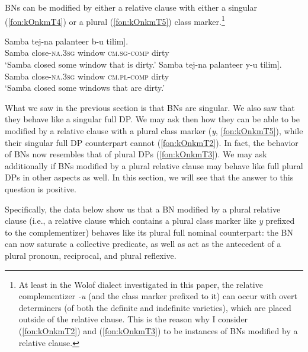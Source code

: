\documentclass[output=paper]{langscibook}
\begin{document}
\noindent   BNs can be modified by either a relative clause with either a singular (\ref{fon:kOnkmT4}) or a plural (\ref{fon:kOnkmT5}) class marker.\footnote{At least in the Wolof dialect investigated in this paper, the relative complementizer \textit{-u} (and the class marker prefixed to it) can occur with overt determiners (of both the definite and indefinite varieties), which are placed outside of the relative clause. This is the reason why I consider (\ref{fon:kOnkmT2}) and (\ref{fon:kOnkmT3}) to be instances of BNs modified by a relative clause.}
	
	
		\ea
				\ea \gll	Samba tej-na {palanteer} \minsp{[} b-u tilim].\\
					Samba close-\textsc{na.3sg} window {} \textsc{cm.sg-comp} dirty\\
					\glt    `Samba closed some window that is dirty.'\label{fon:kOnkmT4}
				\ex \gll	Samba tej-na {palanteer} \minsp{[} y-u tilim].\\
					Samba close-\textsc{na.3sg} window {} \textsc{cm.pl-comp} dirty\\
					\glt    `Samba closed some windows that are dirty.'\label{fon:kOnkmT5}
        		\z
	    \z

	
\noindent What we saw in the previous section is that BNs are singular. We also saw that they behave like a singular full DP. We may ask then how they can be able to be modified by a relative clause with a plural class marker (\textit{y}, \ref{fon:kOnkmT5}), while their singular full DP counterpart cannot (\ref{fon:kOnkmT2}). In fact, the behavior of BNs now resembles that of plural DPs (\ref{fon:kOnkmT3}). We may ask additionally if BNs modified by a plural relative clause may behave like full plural DPs in other aspects as well. In this section, we will see that the answer to this question is positive.

Specifically, the data below show us that a BN modified by a plural relative clause (i.e., a relative clause which contains a plural class marker like \textit{y} prefixed to the complementizer) behaves like its plural full nominal counterpart: the BN can now saturate a collective predicate, as well as act as the antecedent of a plural pronoun, reciprocal, and plural reflexive.
	
\end{document}

